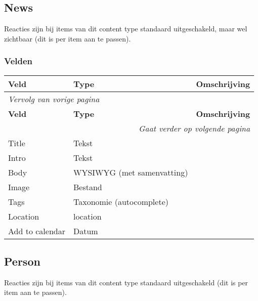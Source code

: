 \subsection{News}
\label{sec:content-news}
Reacties zijn bij items van dit content type standaard uitgeschakeld, maar wel zichtbaar (dit is per item aan te passen).

\subsubsection{Velden}
  \begin{longtable}{| p{3.75cm}|p{3.75cm}|p{7.50cm}|}
  \hline
  \rowcolor{tableheader}
  \textbf{Veld} & \textbf{Type} & \textbf{Omschrijving}  \tabularnewline
  \hline
\endfirsthead
\multicolumn{3}{l}{\textit{Vervolg van vorige pagina}} \\
\hline
\rowcolor{tableheader}
  \textbf{Veld} & \textbf{Type} & \textbf{Omschrijving}  \tabularnewline
  \hline
\hline
\endhead
\multicolumn{3}{r}{\textit{Gaat verder op volgende pagina}} \\
\endfoot
\hline
\endlastfoot
  \raggedright{Title} & \raggedright{Tekst} & \raggedright{}  \tabularnewline
  \hline
  \raggedright{Intro} & \raggedright{Tekst} & \raggedright{}  \tabularnewline
  \hline
  \raggedright{Body} & \raggedright{WYSIWYG (met samenvatting)} & \raggedright{}  \tabularnewline
  \hline
  \raggedright{Image} & \raggedright{Bestand} & \raggedright{}  \tabularnewline
  \hline
  \raggedright{Tags} & \raggedright{Taxonomie (autocomplete)} & \raggedright{}  \tabularnewline
  \hline
  \raggedright{Location} & \raggedright{location} & \raggedright{}  \tabularnewline
  \hline
  \raggedright{Add to calendar} & \raggedright{Datum} & \raggedright{}  \tabularnewline
  \hline
  \end{longtable}

\subsection{Person}
\label{sec:content-person}
Reacties zijn bij items van dit content type standaard uitgeschakeld (dit is per item aan te passen).

